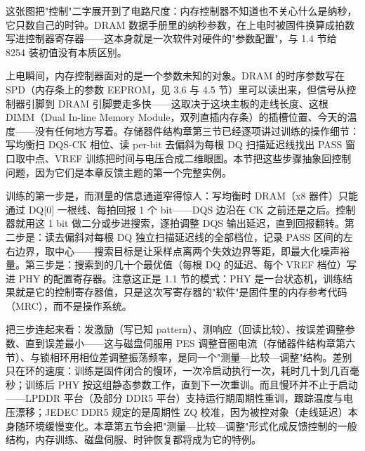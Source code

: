
这张图把"控制"二字展开到了电路尺度：内存控制器不知道也不关心什么是纳秒，它只数自己的时钟。DRAM 数据手册里的纳秒参数，在上电时被固件换算成拍数写进控制器寄存器——这本身就是一次软件对硬件的"参数配置"，与 1.4 节给 8254 装初值没有本质区别。


上电瞬间，内存控制器面对的是一个参数未知的对象。DRAM 的时序参数写在 SPD（内存条上的参数 EEPROM，见 3.6 与 4.5 节）里可以读出来，但信号从控制器引脚到 DRAM 引脚要走多快——这取决于这块主板的走线长度、这根 DIMM（Dual In-line Memory Module，双列直插内存条）的插槽位置、今天的温度——没有任何地方写着。存储器件结构章第三节已经逐项讲过训练的操作细节：写均衡扫 DQS-CK 相位、读 per-bit 去偏斜为每根 DQ 扫描延迟线找出 PASS 窗口取中点、VREF 训练把时间与电压合成二维眼图。本节把这些步骤抽象回控制问题，因为它们是本章反馈主题的第一个完整实例。

训练的第一步是，而测量的信息通道窄得惊人：写均衡时 DRAM（x8 器件）只能通过 DQ[0] 一根线、每拍回报 1 个 bit——DQS 边沿在 CK 之前还是之后。控制器就用这 1 bit 做二分或步进搜索，逐拍调整 DQS 输出延迟，直到回报翻转。第二步是：读去偏斜对每根 DQ 独立扫描延迟线的全部档位，记录 PASS 区间的左右边界，取中心——搜索目标是让采样点离两个失效边界等距，即最大化噪声裕量。第三步是：搜索到的几十个最优值（每根 DQ 的延迟、每个 VREF 档位）写进 PHY 的配置寄存器。注意这正是 1.1 节的模式：PHY 是一台状态机，训练结果就是它的控制寄存器值，只是这次写寄存器的"软件"是固件里的内存参考代码（MRC），而不是操作系统。

把三步连起来看：发激励（写已知 pattern）、测响应（回读比较）、按误差调整参数、直到误差最小——这与磁盘伺服用 PES 调整音圈电流（存储器件结构章第六节）、与锁相环用相位差调整振荡频率，是同一个"测量—比较—调整"结构。差别只在环的速度：训练是固件闭合的慢环，一次冷启动执行一次，耗时几十到几百毫秒；训练后 PHY 按这组静态参数工作，直到下一次重训。而且慢环并不止于启动——LPDDR 平台（及部分 DDR5 平台）支持运行期周期性重训，跟踪温度与电压漂移；JEDEC DDR5 规定的是周期性 ZQ 校准，因为被控对象（走线延迟）本身随环境缓慢变化。本章第五节会把"测量—比较—调整"形式化成反馈控制的一般结构，内存训练、磁盘伺服、时钟恢复都将成为它的特例。
